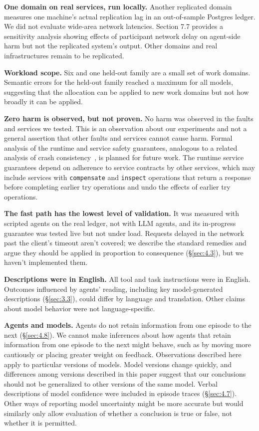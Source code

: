 \documentclass[letterpaper,twocolumn,10pt]{article}
\begin{document}
\textbf{One domain on real services, run locally.} Another replicated domain measures one machine's actual replication lag in an out-of-sample Postgres ledger. We did not evaluate wide-area network latencies. Section 7.7 provides a sensitivity analysis showing effects of participant network delay on agent-side harm but not the replicated system's output. Other domains and real infrastructures remain to be replicated.

\textbf{Workload scope.} Six and one held-out family are a small set of work domains. Semantic errors for the held-out family reached a maximum for all models, suggesting that the allocation can be applied to new work domains but not how broadly it can be applied.

\textbf{Zero harm is observed, but not proven.} No harm was observed in the faults and services we tested. This is an observation about our experiments and not a general assertion that other faults and services cannot cause harm. Formal analysis of the runtime and service safety guarantees, analogous to a related analysis of crash consistency~\cite{leblanc2025power}, is planned for future work. The runtime service guarantees depend on adherence to service contracts by other services, which may include services with \texttt{compensate} and \texttt{inspect} operations that return a response before completing earlier try operations and undo the effects of earlier try operations.

\textbf{The fast path has the lowest level of validation.} It was measured with scripted agents on the real ledger, not with LLM agents, and its in-progress guarantee was tested live but not under load. Requests delayed in the network past the client's timeout aren't covered; we describe the standard remedies and argue they should be applied in proportion to consequence (\S\ref{sec:4.3}), but we haven't implemented them.

\textbf{Descriptions were in English.} All tool and task instructions were in English. Outcomes influenced by agents' reading, including key model-generated descriptions (\S\ref{sec:3.3}), could differ by language and translation. Other claims about model behavior were not language-specific.

\textbf{Agents and models.} Agents do not retain information from one episode to the next (\S\ref{sec:4.8}). We cannot make inferences about how agents that retain information from one episode to the next might behave, such as by moving more cautiously or placing greater weight on feedback. Observations described here apply to particular versions of models. Model versions change quickly, and differences among versions described in this paper suggest that our conclusions should not be generalized to other versions of the same model. Verbal descriptions of model confidence were included in episode traces (\S\ref{sec:4.7}). Other ways of reporting model uncertainty might be more accurate but would similarly only allow evaluation of whether a conclusion is true or false, not whether it is permitted.
\end{document}
